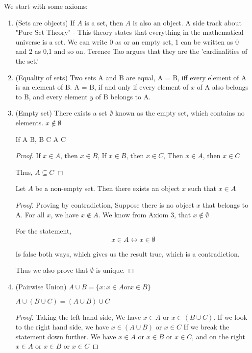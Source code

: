 \documentclass[11pt]{report}
\begin{document}
We start with some axioms:
\begin{enumerate}
	\item (Sets are objects) If $A$ is a set, then $A$ is also an object.
	      A side track about "Pure Set Theory" - This theory states that everything in the mathematical universe is a set. We can write 0 as {} or an empty set, 1 can be written as {0} and 2 as {0,1} and so on. Terence Tao argues that they are the 'cardinalities of the set.'
	\item (Equality of sets) Two sets A and B are equal, A = B, iff every element of A is an element of B. A = B, if and only if every element of $x$ of A also belongs to B, and every element $y$ of B belongs to A.
	\item (Empty set) There exists a set $\emptyset$ known as the empty set, which contains no elements. $x \notin \emptyset$
	      \begin{prop}
		      If A \subseteq B, B \subseteq C \Rightarrow A \subseteq C
	      \end{prop}
	      \begin{proof}
		      If $x \in A$, then $x \in B$,
		      If $x \in B$, then $x \in C$,
		      Then $x \in A$, then $x \in C$

		      Thus, $A \subseteq C$
	      \end{proof}
	      \begin{lemma}
		      Let $A$ be a non-empty set. Then there exists an object $x$ such that $x \in A$
	      \end{lemma}
	      \begin{proof}
		      Proving by contradiction,
		      Suppose there is no object $x$ that belongs to A. For all $x$, we have $x \notin A$. We know from Axiom 3, that $x \notin \emptyset$

		      For the statement,
		      $$ x \in A \leftrightarrow x \in \emptyset $$

		      Is false both ways, which gives us the result true, which is a contradiction.

		      Thus we also prove that $\emptyset$ is unique.
	      \end{proof}
	\item (Pairwise Union) $A \cup B = \{x : x \in A \text{or} x \in B\}$
	      \begin{lemma}
		      $A \cup (B \cup C) = (A \cup B) \cup C$
	      \end{lemma}
	      \begin{proof}
		      Taking the left hand side,
		      We have $x \in A$ or $x \in (B \cup C)$. If we look to the right hand side, we have $x \in (A \cup B)$ or $ x \in C$
		      If we break the statement down further.
		      We have $x \in A$ or $x \in B$ or $x \in C$, and  on the right $x \in A$ or $x \in B$ or $x\in C$


\end{proof}
\end{enumerate}
\end{document}
